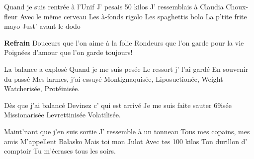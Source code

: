 \footnotemark [
ititle={Et c'est tellement vrai...},
tu={Dis-lui (Claude François)}]


\beginverse
Quand je suis rentrée à l'Unif
J' pesais 50 kilos
J' ressemblais à Claudia Choux-fleur
Avec le même cerveau
Les à-fonds rigolo
Les spaghettis bolo
La p'tite frite mayo
Just' avant le dodo
\endverse

\beginchorus
\textbf{Refrain}
Douceurs que l'on aime à la folie
Rondeurs que l'on garde pour la vie
Poignées d'amour que l'on garde toujours!
\endchorus

\beginverse
La balance a explosé
Quand je me suis pesée
Le ressort j' l'ai gardé
En souvenir du passé
Mes larmes, j'ai essuyé
Montignaquisée,
Liposuctionée,
Weight Watcherisée,
Protéinisée.
\endverse

\beginverse
Dès que j'ai balancé
Devinez c' qui est arrivé
Je me suis faite sauter
69isée
Missionarisée
Levrettinisée
Volatilisée.
\endverse

\beginverse
Maint'nant que j'en suis sortie
J' ressemble à un tonneau
Tous mes copains, mes amis
M'appellent Balasko
Mais toi mon Julot
Avec tes 100 kilos
Ton durillon d' comptoir
Tu m'écrases tous les soirs.
\endverse
\endsong